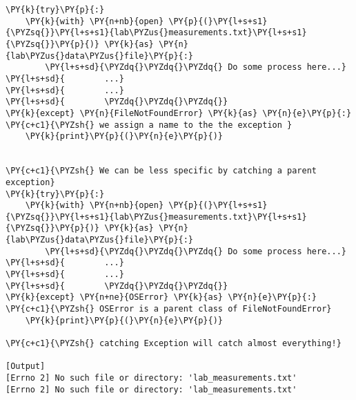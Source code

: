 \begin{Verbatim}[label=\makebox{\url{https://github.com/lucabaldini/cmepda/tree/master/slides/latex/snippets/try\_block.py}},commandchars=\\\{\}]
\PY{k}{try}\PY{p}{:}
    \PY{k}{with} \PY{n+nb}{open} \PY{p}{(}\PY{l+s+s1}{\PYZsq{}}\PY{l+s+s1}{lab\PYZus{}measurements.txt}\PY{l+s+s1}{\PYZsq{}}\PY{p}{)} \PY{k}{as} \PY{n}{lab\PYZus{}data\PYZus{}file}\PY{p}{:}
        \PY{l+s+sd}{\PYZdq{}\PYZdq{}\PYZdq{} Do some process here...}
\PY{l+s+sd}{        ...}
\PY{l+s+sd}{        ...}
\PY{l+s+sd}{        \PYZdq{}\PYZdq{}\PYZdq{}}
\PY{k}{except} \PY{n}{FileNotFoundError} \PY{k}{as} \PY{n}{e}\PY{p}{:} \PY{c+c1}{\PYZsh{} we assign a name to the the exception }
    \PY{k}{print}\PY{p}{(}\PY{n}{e}\PY{p}{)}


\PY{c+c1}{\PYZsh{} We can be less specific by catching a parent exception}
\PY{k}{try}\PY{p}{:}
    \PY{k}{with} \PY{n+nb}{open} \PY{p}{(}\PY{l+s+s1}{\PYZsq{}}\PY{l+s+s1}{lab\PYZus{}measurements.txt}\PY{l+s+s1}{\PYZsq{}}\PY{p}{)} \PY{k}{as} \PY{n}{lab\PYZus{}data\PYZus{}file}\PY{p}{:}
        \PY{l+s+sd}{\PYZdq{}\PYZdq{}\PYZdq{} Do some process here...}
\PY{l+s+sd}{        ...}
\PY{l+s+sd}{        ...}
\PY{l+s+sd}{        \PYZdq{}\PYZdq{}\PYZdq{}}
\PY{k}{except} \PY{n+ne}{OSError} \PY{k}{as} \PY{n}{e}\PY{p}{:} \PY{c+c1}{\PYZsh{} OSError is a parent class of FileNotFoundError}
    \PY{k}{print}\PY{p}{(}\PY{n}{e}\PY{p}{)}

\PY{c+c1}{\PYZsh{} catching Exception will catch almost everything!}

[Output]
[Errno 2] No such file or directory: 'lab_measurements.txt'
[Errno 2] No such file or directory: 'lab_measurements.txt'
\end{Verbatim}